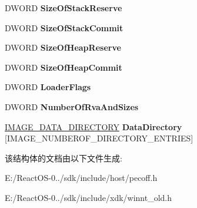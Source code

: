 \begin{DoxyCompactItemize}
\item 
\mbox{\label{struct___i_m_a_g_e___o_p_t_i_o_n_a_l___h_e_a_d_e_r32_a35cef0788acbbadf46c5912bb49d6454}} 
D\+W\+O\+RD {\bfseries Size\+Of\+Stack\+Reserve}
\item 
\mbox{\label{struct___i_m_a_g_e___o_p_t_i_o_n_a_l___h_e_a_d_e_r32_a5172f716ba834f82dc5642fa3107ecbf}} 
D\+W\+O\+RD {\bfseries Size\+Of\+Stack\+Commit}
\item 
\mbox{\label{struct___i_m_a_g_e___o_p_t_i_o_n_a_l___h_e_a_d_e_r32_a61493bd27cd6b7f3bb936566cf5b7481}} 
D\+W\+O\+RD {\bfseries Size\+Of\+Heap\+Reserve}
\item 
\mbox{\label{struct___i_m_a_g_e___o_p_t_i_o_n_a_l___h_e_a_d_e_r32_a42aa3b5542af057b56a61ef5bce9d96b}} 
D\+W\+O\+RD {\bfseries Size\+Of\+Heap\+Commit}
\item 
\mbox{\label{struct___i_m_a_g_e___o_p_t_i_o_n_a_l___h_e_a_d_e_r32_ac5dbc103aff107b106aad5729c2f987d}} 
D\+W\+O\+RD {\bfseries Loader\+Flags}
\item 
\mbox{\label{struct___i_m_a_g_e___o_p_t_i_o_n_a_l___h_e_a_d_e_r32_a2947c3842cc923a3d6bedffe19dce4d7}} 
D\+W\+O\+RD {\bfseries Number\+Of\+Rva\+And\+Sizes}
\item 
\mbox{\label{struct___i_m_a_g_e___o_p_t_i_o_n_a_l___h_e_a_d_e_r32_aeaf9607543aa4ffaa4172ae0a4f9635b}} 
\hyperlink{struct___i_m_a_g_e___d_a_t_a___d_i_r_e_c_t_o_r_y}{I\+M\+A\+G\+E\+\_\+\+D\+A\+T\+A\+\_\+\+D\+I\+R\+E\+C\+T\+O\+RY} {\bfseries Data\+Directory} \mbox{[}I\+M\+A\+G\+E\+\_\+\+N\+U\+M\+B\+E\+R\+O\+F\+\_\+\+D\+I\+R\+E\+C\+T\+O\+R\+Y\+\_\+\+E\+N\+T\+R\+I\+ES\mbox{]}
\end{DoxyCompactItemize}


该结构体的文档由以下文件生成\+:\begin{DoxyCompactItemize}
\item 
E\+:/\+React\+O\+S-\/0../sdk/include/host/pecoff.\+h\item 
E\+:/\+React\+O\+S-\/0../sdk/include/xdk/winnt\+\_\+old.\+h\end{DoxyCompactItemize}
